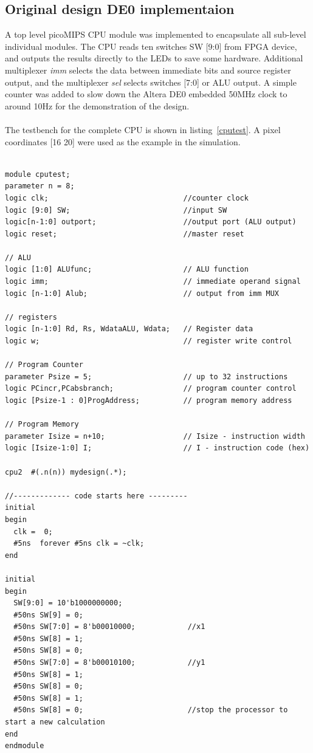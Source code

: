 \subsection{Original design DE0 implementaion}
A top level picoMIPS CPU module was implemented to encapsulate all sub-level individual modules. The CPU reads ten switches SW [9:0] from FPGA device, and outputs the results directly to the LEDs to save some hardware. Additional multiplexer \textit{imm} selects the data between immediate bits and source register output, and the multiplexer \textit{sel} selects switches [7:0] or ALU output. A simple counter \cite{slowcounter} was added to slow down the Altera DE0 embedded 50MHz clock to around 10Hz for the demonstration of the design.\\\\
The testbench for the complete CPU is shown in listing~\ref{cputest}. A pixel coordinates [16 20] were used as the example in the simulation.\\\\
\begin{lstlisting}
module cputest;
parameter n = 8;
logic clk;                               //counter clock
logic [9:0] SW;                          //input SW 
logic[n-1:0] outport;                    //output port (ALU output)
logic reset;                             //master reset

// ALU
logic [1:0] ALUfunc;                     // ALU function
logic imm;                               // immediate operand signal
logic [n-1:0] Alub;                      // output from imm MUX

// registers
logic [n-1:0] Rd, Rs, WdataALU, Wdata;   // Register data
logic w;                                 // register write control

// Program Counter  
parameter Psize = 5;                     // up to 32 instructions
logic PCincr,PCabsbranch;                // program counter control
logic [Psize-1 : 0]ProgAddress;          // program memory address

// Program Memory
parameter Isize = n+10;                  // Isize - instruction width
logic [Isize-1:0] I;                     // I - instruction code (hex)

cpu2  #(.n(n)) mydesign(.*);

//------------- code starts here ---------
initial
begin
  clk =  0;
  #5ns  forever #5ns clk = ~clk;
end

initial
begin
  SW[9:0] = 10'b1000000000;  
  #50ns SW[9] = 0;
  #50ns SW[7:0] = 8'b00010000;            //x1
  #50ns SW[8] = 1;
  #50ns SW[8] = 0;
  #50ns SW[7:0] = 8'b00010100;            //y1
  #50ns SW[8] = 1;  
  #50ns SW[8] = 0;
  #50ns SW[8] = 1;
  #50ns SW[8] = 0;                        //stop the processor to start a new calculation
end
endmodule 
\end{lstlisting}


